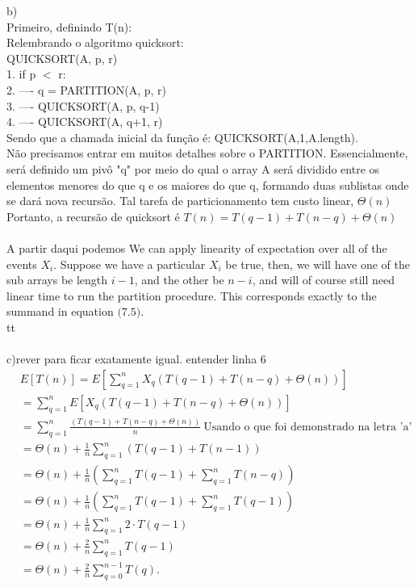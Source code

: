 \documentclass{article}
\begin{document}
b)\\
Primeiro, definindo T(n):\\
Relembrando o algoritmo quicksort:\\
QUICKSORT(A, p, r) \\
1. if p $<$ r: \\
2. ---- q = PARTITION(A, p, r) \\
3. ---- QUICKSORT(A, p, q-1) \\
4. ---- QUICKSORT(A, q+1, r) \\
Sendo que a chamada inicial da função é: QUICKSORT(A,1,A.length).\\
Não precisamos entrar em muitos detalhes sobre o PARTITION. Essencialmente, será definido um pivô "q" por meio do qual o array A será dividido entre os elementos menores do que q e os maiores do que q, formando duas sublistas onde se dará nova recursão. Tal tarefa de particionamento tem custo linear, $\Theta(n)$\\
Portanto, a recursão de quicksort é $ T(n) = T(q-1)+T(n-q)+\Theta(n) $\\\\

A partir daqui podemos We can apply linearity of expectation over all of the events $X_i$. Suppose we have a particular $X_i$ be true, then, we will have one of the sub arrays be length $i - 1$, and the other be $n - i$, and will of course still need linear time to run the partition procedure. This corresponds exactly to the summand in equation $\text{(7.5)}$.
\\tt\\\\
c)rever para ficar exatamente igual. entender linha 6 \\
\begin{align*}
&E[T(n)]=E\left[\sum_{q=1}^{n}X_q(T(q-1)+T(n-q)+\Theta(n))\right]   \\
&= \sum_{q=1}^n  E[X_q(T(q-1)+T(n-q)+\Theta(n))]\\
&= \sum_{q=1}^n \frac{(T(q-1)+T(n-q)+\Theta(n))}{n}\  \text{Usando o que foi demonstrado na letra 'a'} \\
&= \Theta(n)+\frac{1}{n} \sum_{q=1}^n(T(q-1)+T(n-1)) \\
&= \Theta(n)+\frac{1}{n} \left(\sum_{q=1}^n T(q-1)+\sum_{q=1}^nT(n-q) \right) \\
&= \Theta(n)+\frac{1}{n} \left(\sum_{q=1}^n T(q-1)+\sum_{q=1}^nT(q-1) \right) \\
&= \Theta(n)+\frac{1}{n} \sum_{q=1}^n 2\cdot T(q-1) \\
&= \Theta(n)+\frac{2}{n} \sum_{q=1}^n T(q-1) \\
&= \Theta(n)+\frac{2}{n} \sum_{q=0}^{n-1} T(q). \\
\end{align*}
\end{document}
